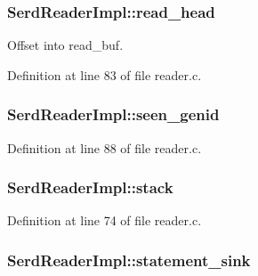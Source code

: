 \subsubsection[{\texorpdfstring{read\+\_\+head}{read_head}}]{ Serd\+Reader\+Impl\+::read\+\_\+head}\hypertarget{struct_serd_reader_impl_acc33bdf3a5c4695c3b0ef4eb0a2334f6}{}\label{struct_serd_reader_impl_acc33bdf3a5c4695c3b0ef4eb0a2334f6}


Offset into read\+\_\+buf. 



Definition at line 83 of file reader.\+c.

\subsubsection[{\texorpdfstring{seen\+\_\+genid}{seen_genid}}]{ Serd\+Reader\+Impl\+::seen\+\_\+genid}\hypertarget{struct_serd_reader_impl_a7d7280fc1b56b1ddcb6a309b7e206152}{}\label{struct_serd_reader_impl_a7d7280fc1b56b1ddcb6a309b7e206152}


Definition at line 88 of file reader.\+c.

\subsubsection[{\texorpdfstring{stack}{stack}}]{ Serd\+Reader\+Impl\+::stack}\hypertarget{struct_serd_reader_impl_a8b07284d327aa1d28a9db3f5513b7b32}{}\label{struct_serd_reader_impl_a8b07284d327aa1d28a9db3f5513b7b32}


Definition at line 74 of file reader.\+c.

\subsubsection[{\texorpdfstring{statement\+\_\+sink}{statement_sink}}]{ Serd\+Reader\+Impl\+::statement\+\_\+sink}\hypertarget{struct_serd_reader_impl_aca8f39fb5b4a86cb32a716c00d6c4b35}{}\label{struct_serd_reader_impl_aca8f39fb5b4a86cb32a716c00d6c4b35}


